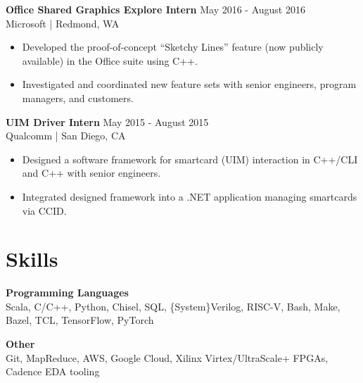 \documentclass[line]{res}
\begin{document}
\begin{resume}
\vspace{-3mm}

\textbf{Office Shared Graphics Explore Intern} \hfill May 2016 - August 2016
\\
Microsoft | Redmond, WA
\\
\vspace{-3mm}
\begin{itemize}
\item Developed the proof-of-concept ``Sketchy Lines'' feature (now publicly available) in the Office suite using C++.
\item Investigated and coordinated new feature sets with senior engineers, program managers, and customers.
\end{itemize}

\vspace{-3mm}

\textbf{UIM Driver Intern} \hfill May 2015 - August 2015
\\
Qualcomm | San Diego, CA
\\
\vspace{-3mm}
\begin{itemize}
\item Designed a software framework for smartcard (UIM) interaction in C++/CLI and C++ with senior engineers.
\item Integrated designed framework into a .NET application managing smartcards via CCID.
\end{itemize}

\vspace{-3mm}

\section{\Large{Skills}}
\label{sec:skills}
\vspace{1mm}

\begin{multicols}{2}
\textbf{Programming Languages}
\\
Scala, C/C++, Python, Chisel, SQL, \{System\}Verilog, RISC-V, Bash, Make, Bazel, TCL, TensorFlow, PyTorch

\columnbreak

\textbf{Other}
\\
Git, MapReduce, AWS, Google Cloud, Xilinx Virtex/UltraScale+ FPGAs, Cadence EDA tooling

\end{multicols}

\vspace{-7mm}


\end{resume}
\end{document}
